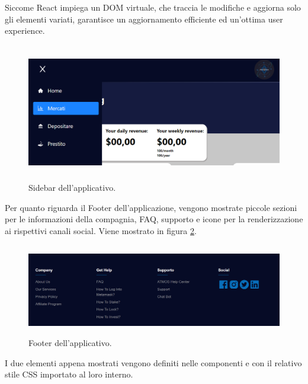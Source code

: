 Siccome React impiega un DOM virtuale, che traccia le modifiche e aggiorna solo gli elementi variati, garantisce un aggiornamento efficiente ed un’ottima user experience. 
\begin{figure}[h]
    \centering
    \includegraphics[width=13cm,height=6cm]{Immagini/sidebar.png}
    \caption[Sidebar dell'applicativo riferito allo staking]{Sidebar dell'applicativo.}
    \label{sidebar}
\end{figure}

Per quanto riguarda il Footer dell'applicazione, vengono mostrate piccole sezioni per le informazioni della compagnia, FAQ, supporto e icone per la renderizzazione ai rispettivi canali social. Viene mostrato in figura \ref{footer}.

\begin{figure}[h]
    \centering
    \includegraphics[width=14cm,height=4cm]{Immagini/footer.png}
    \caption[Footer dell'applicativo riferito allo staking]{Footer dell'applicativo.}
    \label{footer}
\end{figure}

I due elementi appena mostrati vengono definiti nelle componenti  e  con il relativo stile CSS importato al loro interno.

